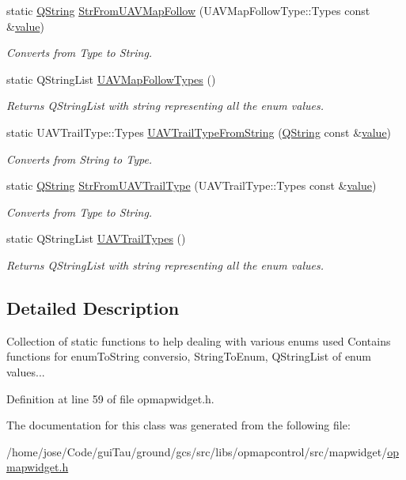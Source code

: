 \begin{DoxyCompactItemize}
static \hyperlink{group___u_a_v_objects_plugin_gab9d252f49c333c94a72f97ce3105a32d}{Q\-String} \hyperlink{group___o_p_map_widget_ga94cca4ceda7e5cdea3ae019436aa0429}{Str\-From\-U\-A\-V\-Map\-Follow} (U\-A\-V\-Map\-Follow\-Type\-::\-Types const \&\hyperlink{glext_8h_aa0e2e9cea7f208d28acda0480144beb0}{value})
\begin{DoxyCompactList}\small\item\em Converts from Type to String. \end{DoxyCompactList}\item 
static Q\-String\-List \hyperlink{group___o_p_map_widget_gacb5ad4b31c187f1d10098f83053246ff}{U\-A\-V\-Map\-Follow\-Types} ()
\begin{DoxyCompactList}\small\item\em Returns Q\-String\-List with string representing all the enum values. \end{DoxyCompactList}\item 
static U\-A\-V\-Trail\-Type\-::\-Types \hyperlink{group___o_p_map_widget_ga09a4876b008985c01beda818f860830b}{U\-A\-V\-Trail\-Type\-From\-String} (\hyperlink{group___u_a_v_objects_plugin_gab9d252f49c333c94a72f97ce3105a32d}{Q\-String} const \&\hyperlink{glext_8h_aa0e2e9cea7f208d28acda0480144beb0}{value})
\begin{DoxyCompactList}\small\item\em Converts from String to Type. \end{DoxyCompactList}\item 
static \hyperlink{group___u_a_v_objects_plugin_gab9d252f49c333c94a72f97ce3105a32d}{Q\-String} \hyperlink{group___o_p_map_widget_gab2895e09cf7115779c738cc43d815123}{Str\-From\-U\-A\-V\-Trail\-Type} (U\-A\-V\-Trail\-Type\-::\-Types const \&\hyperlink{glext_8h_aa0e2e9cea7f208d28acda0480144beb0}{value})
\begin{DoxyCompactList}\small\item\em Converts from Type to String. \end{DoxyCompactList}\item 
static Q\-String\-List \hyperlink{group___o_p_map_widget_gad33e776681a2d3d4d44bef508d231336}{U\-A\-V\-Trail\-Types} ()
\begin{DoxyCompactList}\small\item\em Returns Q\-String\-List with string representing all the enum values. \end{DoxyCompactList}\end{DoxyCompactItemize}


\subsection{Detailed Description}
Collection of static functions to help dealing with various enums used Contains functions for enum\-To\-String conversio, String\-To\-Enum, Q\-String\-List of enum values... 

Definition at line 59 of file opmapwidget.\-h.



The documentation for this class was generated from the following file\-:\begin{DoxyCompactItemize}
\item 
/home/jose/\-Code/gui\-Tau/ground/gcs/src/libs/opmapcontrol/src/mapwidget/\hyperlink{opmapwidget_8h}{opmapwidget.\-h}\end{DoxyCompactItemize}
